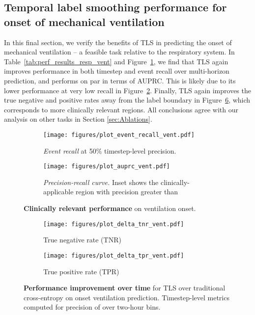 \documentclass[nohyperref]{article}
\begin{document}
\subsection{Temporal label smoothing performance for onset of mechanical ventilation}

In this final section, we verify the benefits of TLS in predicting the onset of mechanical ventilation -- a feasible task relative to the respiratory system. In Table~\ref{tab:perf_results_resp_vent}  and Figure~\ref{fig:based_vent}, we find that TLS again improves performance in both timestep and event recall over multi-horizon prediction, and performs on par in terms of AUPRC. This is likely due to its lower performance at very low recall in Figure~\ref{fig:PR_curve_vent}. Finally, TLS again improves the true negative and positive rates away from the label boundary  in Figure~\ref{fig:plot_delta_vent}, which corresponds to more clinically relevant regions. All conclusions agree with our analysis on other tasks in Section \ref{sec:Ablations}.

\begin{figure}[h]
\centering
\begin{subfigure}[b]{0.49\textwidth}
 \centering
  \texttt{[image: figures/plot\_event\_recall\_vent.pdf]}
  \caption{\textit{Event recall} at 50\% timestep-level precision.} \label{fig:based_vent}
\end{subfigure}
\begin{subfigure}[b]{0.49\textwidth}
  \centering
  \texttt{[image: figures/plot\_auprc\_vent.pdf]}
  \caption{\textit{Precision-recall curve.} Inset shows the clinically-applicable region with precision greater than }
  \label{fig:PR_curve_vent}
\end{subfigure}
\caption{\textbf{Clinically relevant performance} on ventilation onset.}
\label{fig:clinical_performance_vent}
\end{figure}

\begin{figure}[h]
\begin{subfigure}[b]{0.47\textwidth}
  \centering
  \texttt{[image: figures/plot\_delta\_tnr\_vent.pdf]}\vspace{-0.5em}\caption{True negative rate (TNR)}\vspace{-0.25em}
  \label{fig:delta_tnr_vent}
\end{subfigure} \hfill
\begin{subfigure}[b]{0.47\textwidth}
 \centering
  \texttt{[image: figures/plot\_delta\_tpr\_vent.pdf]}\vspace{-0.5em}\caption{True positive rate (TPR)}\vspace{-0.25em}
  \label{fig:delta_tpr_vent}
\end{subfigure}
\caption{\textbf{Performance improvement over time} for TLS over traditional cross-entropy on onset ventilation prediction. Timestep-level metrics computed for precision of  over two-hour bins.}
\vspace{-1em}
\label{fig:plot_delta_vent}
\end{figure}
\end{document}
